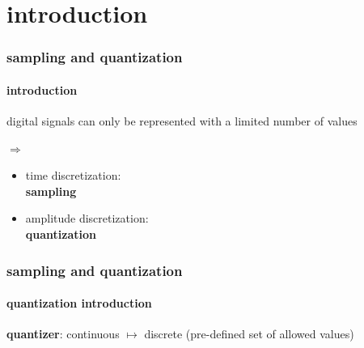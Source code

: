 


\subtitle{Part 11: Discretization 2---Quantization}


	

\section[intro]{introduction}
    \begin{frame}\frametitle{sampling and quantization}\framesubtitle{introduction}
        digital signals can only be represented with a limited number of values
        \pause
        
        $\Rightarrow$
        \begin{itemize}
            \item	time discretization:\\ \textbf{sampling}
            \bigskip
            \item	amplitude discretization:\\ \textcolor{gtgold}{\textbf{quantization}}
        \end{itemize}
    \end{frame}
	\begin{frame}\frametitle{sampling and quantization}\framesubtitle{quantization introduction}
		\vspace{-3mm}
        \textbf{quantizer}: \linebreak
		continuous $\mapsto$ discrete (pre-defined set of allowed values)
        
    \end{frame}
